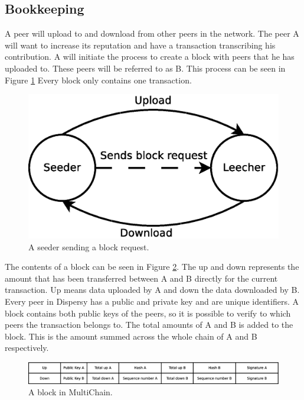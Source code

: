 \subsection{Bookkeeping}
A peer will upload to and download from other peers in the network.
The peer A will want to increase its reputation and have a transaction transcribing his contribution.
A will initiate the process to create a block with peers that he has uploaded to.
These peers will be referred to as B.
This process can be seen in Figure \ref{fig:seeder-leecher}
Every block only contains one transaction.

\begin{figure}
	\centerline{\includegraphics[scale=0.3]{design/figs/seeder-leecher.eps}}
	\caption{A seeder sending a block request.}
	\label{fig:seeder-leecher}
\end{figure}

The contents of a block can be seen in Figure \ref{fig:block}.
The up and down represents the amount that has been transferred between A and B directly for the current transaction.
Up means data uploaded by A and down the data downloaded by B.
Every peer in Dispersy has a public and private key and are unique identifiers.
A block contains both public keys of the peers,
so it is possible to verify to which peers the transaction belongs to.
The total amounts of A and B is added to the block.
This is the amount summed across the whole chain of A and B respectively.

\begin{figure}
	\centerline{\includegraphics[scale=0.3]{design/figs/block.eps}}
	\caption{A block in MultiChain.}
	\label{fig:block}
\end{figure}

